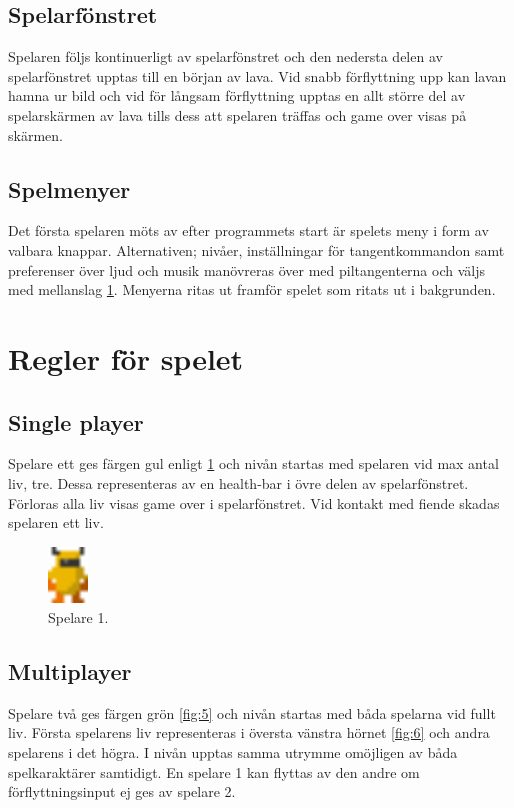\documentclass{TDP005mall}
\begin{document}
\subsection{Spelarfönstret}
Spelaren följs kontinuerligt av spelarfönstret och den nedersta delen av spelarfönstret upptas till en början av lava. Vid snabb förflyttning upp kan lavan hamna ur bild och vid för långsam förflyttning upptas en allt större del av spelarskärmen av lava tills dess att spelaren träffas och game over visas på skärmen.


\subsection{Spelmenyer}
Det första spelaren möts av efter programmets start är spelets meny i form av valbara knappar. Alternativen; nivåer, inställningar för tangentkommandon samt preferenser över ljud och musik manövreras över med piltangenterna och väljs med mellanslag \ref{fig:4}. Menyerna ritas ut framför spelet som ritats ut i bakgrunden.

\newpage

\section{Regler för spelet}%

\subsection{Single player}
 Spelare ett ges färgen gul enligt \ref{fig:4} och nivån startas med spelaren vid max antal liv, tre. Dessa representeras av en health-bar i övre delen av spelarfönstret. Förloras alla liv visas game over i spelarfönstret. Vid kontakt med fiende skadas spelaren ett liv.

\begin{figure}[h!]
  \includegraphics[height=1.5cm]{images/splayer.png}
  \caption{Spelare 1.\label{fig:4}}
\end{figure}

\subsection{Multiplayer}
Spelare två ges färgen grön \ref{fig:5} och nivån startas med båda spelarna vid fullt liv. Första spelarens liv representeras i översta vänstra hörnet \ref{fig:6} och andra spelarens i det högra. I nivån upptas samma utrymme omöjligen av båda spelkaraktärer samtidigt. En spelare 1 kan flyttas av den andre om förflyttningsinput ej ges av spelare 2.
\end{document}
